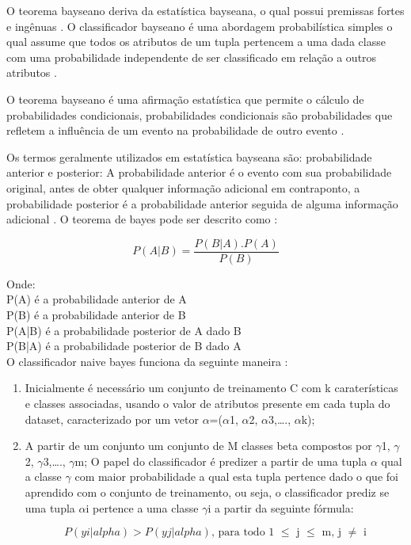 \documentclass[
	12pt,				%
	oneside,			%
	a4paper,			%
	english,			%
	brazil				%
	]{abntex2ppgsi}
\begin{document}
O teorema bayseano deriva da estatística bayseana, o qual possui premissas fortes e ingênuas \cite{Suresh2016}. O classificador bayseano é uma abordagem probabilística simples o qual assume que todos os atributos de um tupla pertencem a uma dada classe com uma probabilidade independente de ser classificado em relação a outros atributos  \cite{Suresh2016}.
 
O teorema bayseano é uma afirmação estatística que permite o cálculo de probabilidades condicionais, probabilidades condicionais são probabilidades que refletem a influência de um evento na probabilidade de outro evento  \cite{ sharma2015} .

Os termos geralmente utilizados em estatística bayseana são: probabilidade anterior e posterior: A probabilidade anterior é o evento com sua probabilidade original, antes de obter qualquer informação adicional em contraponto, a probabilidade posterior é a probabilidade anterior seguida de alguma informação adicional  \cite{ sharma2015}. O teorema de bayes pode ser descrito como  \cite{ sharma2015}:

\begin{equation}
P(A|B) = \frac{P(B|A).P(A)}{P(B)}
\end{equation}

Onde:\\
P(A) é a probabilidade anterior de A\\
P(B) é a probabilidade anterior de B\\
P(A|B) é a probabilidade posterior de A dado B\\
P(B|A) é a probabilidade posterior de B dado A\\

O classificador naive bayes funciona da seguinte maneira \cite{ Seth2016}:

\begin{enumerate}
  \item Inicialmente é necessário um conjunto de treinamento C com k caraterísticas e classes associadas, usando o valor de atributos presente em cada tupla do dataset, caracterizado por um vetor $\alpha$=($\alpha$1, $\alpha$2, $\alpha$3,…., $\alpha$k);
  \item A partir de um conjunto um conjunto de M classes beta compostos por $\gamma$1, $\gamma$2, $\gamma$3,…., $\gamma$m; O papel do classificador é predizer a partir de uma tupla $\alpha$ qual a classe  $\gamma$ com maior probabilidade a qual esta tupla pertence dado o que foi aprendido com o conjunto de treinamento, ou seja, o classificador prediz se uma tupla $\alpha$i pertence a uma classe $\gamma$i a partir da seguinte fórmula:
  
\begin{equation}
P(yi|alpha) > P(yj|alpha)\textrm{, para todo 1 $\leq$ j $\leq$ m, j $\neq$ i}
\end{equation}

\end{enumerate}
\end{document}
